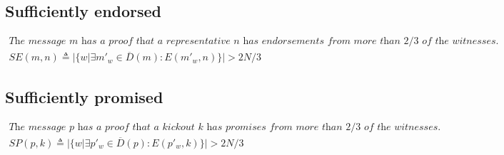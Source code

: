 \documentclass{article}
\begin{document}
    \subsection*{Sufficiently endorsed}
    \[
        \begin{aligned}
            \textit{The message $m$ has a proof that a representative $n$ has endorsements from more than $2/3$ of the witnesses.} \\
            SE(m, n)  \triangleq |\{w | \exists m'_w\in\overline{D}(m): E(m'_w,n) \}| > 2N/3
        \end{aligned}
    \]

    \subsection*{Sufficiently promised}
    \[
        \begin{aligned}
            \textit{The message $p$ has a proof that a kickout $k$ has promises from more than $2/3$ of the witnesses.} \\
            SP(p, k)  \triangleq |\{w | \exists p'_w\in\overline{D}(p): E(p'_w,k) \}| > 2N/3
        \end{aligned}
    \]
\end{document}
